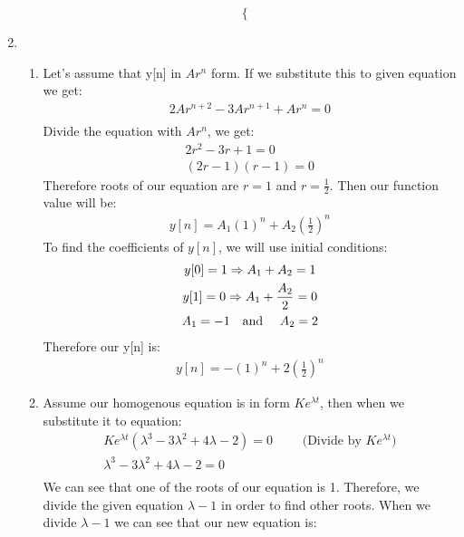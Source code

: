 \documentclass[10pt,a4paper, margin=1in]{article}
\begin{document}
\begin{enumerate}
\begin{enumerate}
\[\begin{cases}
   \end{cases}
\]
    \end{enumerate}

\item %
    \begin{enumerate}
    \item %
    Let's assume that y[n] in $Ar^n$ form. If we substitute this to given equation we get:
    \begin{gather*}
        2Ar^{n+2}-3Ar^{n+1}+Ar^n=0 \\
    \end{gather*}
    Divide the equation with $Ar^n$, we get:
    \begin{gather*}
        2r^2-3r+1=0 \\
        (2r-1)(r-1)=0
    \end{gather*}
    Therefore roots of our equation are $r=1$ and $r=\frac{1}{2}$. Then our function value will be: \\
    \begin{gather*}
        y[n] = A_1(1)^n+A_2(\frac{1}{2})^n 
        \end{gather*}
        To find the coefficients of $y[n]$, we will use initial conditions:
        \begin{gather*}
        y[0] = 1 \Rightarrow A_1+A_2=1 \\
        y[1] = 0 \Rightarrow A_1+\frac{A_2}{2}=0\\
        A_1 = -1 \text{\quad and \quad} A_2=2
    \end{gather*}
    Therefore our y[n] is: 
    \begin{gather*}
        y[n] = -(1)^n+2(\frac{1}{2})^n
    \end{gather*}
    \item %
    Assume our homogenous equation is in form $Ke^{\lambda t}$, then when we substitute it to equation:
    \begin{gather*}
        Ke^{\lambda t}(\lambda^3-3\lambda^2+4\lambda-2) = 0 \text{$\qquad$ (Divide by $Ke^{\lambda t}$)} \\
        \lambda^3-3\lambda^2+4\lambda-2=0 \\
    \end{gather*}
    We can see that one of the roots of our equation is 1. Therefore, we divide the given equation $\lambda -1$ in order to find other roots. When we divide $\lambda -1$ we can see that our new equation is:

\end{enumerate}
\end{enumerate}
\end{document}
